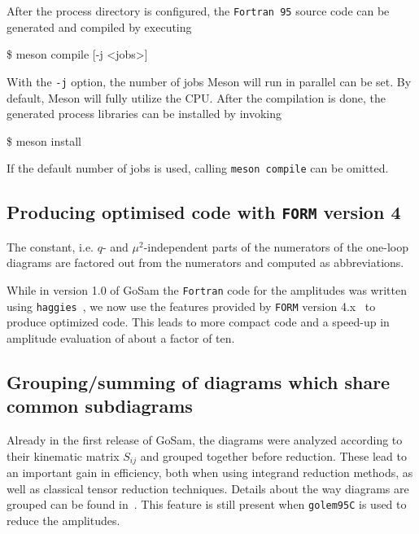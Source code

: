 \documentclass[11pt,a4paper]{refrep}
\newcommand{\gosam}{{\sc GoSam}\xspace}
\newcommand{\golemVC}{{\tt golem95C}\xspace}
\newcommand{\form}{{\tt FORM}\xspace}
\newcommand{\fortranXC}{{\tt Fortran\,95}\xspace}
\newcommand{\haggies}{{\tt haggies}\xspace}
\begin{document}
After the process directory is configured, the \fortranXC source code can be generated and compiled by 
executing
\begin{example}
\$ meson compile [-j <jobs>]
\end{example}
With the {\tt -j} option, the number of jobs Meson will run in parallel can be set. By default, Meson will
fully utilize the CPU. After the compilation is done, the generated process libraries can be installed by
invoking 
\begin{example}
\$ meson install
\end{example}
If the default number of jobs is used, calling {\tt meson compile} can be omitted.


\subsection{Producing optimised code  with {\tt FORM} version 4}

The constant, i.e. $q$- and $\mu^2$-independent parts of the numerators
of the one-loop diagrams are factored out from the numerators and computed
as abbreviations. 

While in version 1.0 of \gosam{} the {\tt Fortran} code for the
amplitudes was written using \haggies~\cite{Reiter:2009ts}, we now
use the features provided by \form{} version
4.x~\cite{Kuipers:2012rf} to produce optimized code. This leads to more
compact code and a speed-up in amplitude evaluation of about a factor
of ten.

\subsection{Grouping/summing of diagrams which share common subdiagrams}
\label{sec:grouping_summing}
Already in the first release of \gosam{}, the diagrams were analyzed
according to their kinematic matrix $S_{ij}$ and grouped together
before reduction. These lead to an important gain in efficiency, both
when using integrand reduction methods, as well as 
classical tensor reduction techniques. Details about the way diagrams
are grouped can be found in~\cite{Cullen:2011ac}. This feature is
still present when \golemVC{} is used to reduce the
amplitudes.
\end{document}
